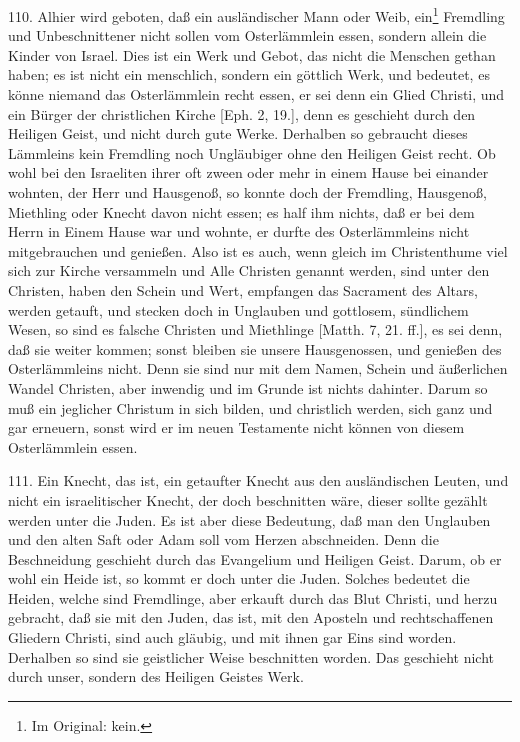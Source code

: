 110. Alhier wird geboten, daß ein ausländischer Mann oder Weib, ein\footnote{Im Original: kein.} Fremdling und Unbeschnittener nicht sollen vom Osterlämmlein essen, sondern allein die Kinder von Israel. Dies ist ein Werk und Gebot, das nicht die Menschen gethan haben; es ist nicht ein menschlich, sondern ein göttlich Werk, und bedeutet, es könne niemand das Osterlämmlein recht essen, er sei denn ein Glied Christi, und ein Bürger der christlichen Kirche [Eph. 2, 19.], denn es geschieht durch den Heiligen Geist, und nicht durch gute Werke. Derhalben so gebraucht dieses Lämmleins kein Fremdling noch Ungläubiger ohne den Heiligen Geist recht. Ob wohl bei den Israeliten ihrer oft zween oder mehr in einem Hause bei einander wohnten, der Herr und Hausgenoß, so konnte doch der Fremdling, Hausgenoß, Miethling oder Knecht davon nicht essen; es half ihm nichts, daß er bei dem Herrn in Einem Hause war und wohnte, er durfte des Osterlämmleins nicht mitgebrauchen und genießen. Also ist es auch, wenn gleich im Christenthume viel sich zur Kirche versammeln und Alle Christen genannt werden, sind unter den Christen, haben den Schein und Wert, empfangen das Sacrament des Altars, werden getauft, und stecken doch in Unglauben und gottlosem, sündlichem Wesen, so sind es falsche Christen und Miethlinge [Matth. 7, 21. ff.], es sei denn, daß sie weiter kommen; sonst bleiben sie unsere Hausgenossen, und genießen des Osterlämmleins nicht. Denn sie sind nur mit dem Namen, Schein und äußerlichen Wandel Christen, aber inwendig und im Grunde ist nichts dahinter. Darum so muß ein jeglicher Christum in sich bilden, und christlich werden, sich ganz und gar erneuern, sonst wird er im neuen Testamente nicht können von diesem Osterlämmlein essen.

111. Ein Knecht, das ist, ein getaufter Knecht aus den ausländischen Leuten, und nicht ein israelitischer Knecht, der doch beschnitten wäre, dieser sollte gezählt werden unter die Juden. Es ist aber diese Bedeutung, daß man den Unglauben und den alten Saft oder Adam soll vom Herzen abschneiden. Denn die Beschneidung geschieht durch das Evangelium und Heiligen Geist. Darum, ob er wohl ein Heide ist, so kommt er doch unter die Juden. Solches bedeutet die Heiden, welche sind Fremdlinge, aber erkauft durch das Blut Christi, und herzu gebracht, daß sie mit den Juden, das ist, mit den Aposteln und rechtschaffenen Gliedern Christi, sind auch gläubig, und mit ihnen gar Eins sind worden. Derhalben so sind sie geistlicher Weise beschnitten worden. Das geschieht nicht durch unser, sondern des Heiligen Geistes Werk.

